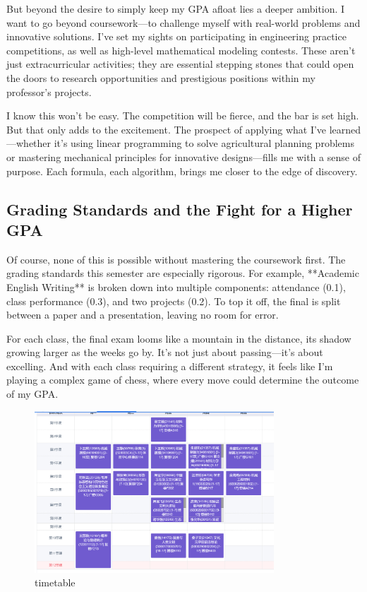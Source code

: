 \documentclass[a4paper]{article} 	%
\begin{document}
But beyond the desire to simply keep my GPA afloat lies a deeper ambition. I want to go beyond coursework—to challenge myself with real-world problems and innovative solutions. I’ve set my sights on participating in engineering practice competitions, as well as high-level mathematical modeling contests. These aren’t just extracurricular activities; they are essential stepping stones that could open the doors to research opportunities and prestigious positions within my professor’s projects.

I know this won’t be easy. The competition will be fierce, and the bar is set high. But that only adds to the excitement. The prospect of applying what I’ve learned—whether it’s using linear programming to solve agricultural planning problems or mastering mechanical principles for innovative designs—fills me with a sense of purpose. Each formula, each algorithm, brings me closer to the edge of discovery.

\subsection*{Grading Standards and the Fight for a Higher GPA}

Of course, none of this is possible without mastering the coursework first. The grading standards this semester are especially rigorous. For example, **Academic English Writing** is broken down into multiple components: attendance (0.1), class performance (0.3), and two projects (0.2). To top it off, the final is split between a paper and a presentation, leaving no room for error.

For each class, the final exam looms like a mountain in the distance, its shadow growing larger as the weeks go by. It’s not just about passing—it’s about excelling. And with each class requiring a different strategy, it feels like I’m playing a complex game of chess, where every move could determine the outcome of my GPA.

\begin{figure}[h!]
	\centering
	\includegraphics[width=0.8\textwidth]{fig001.png}  %
	\caption{timetable}
	\label{fig:001}
\end{figure}
\end{document}

